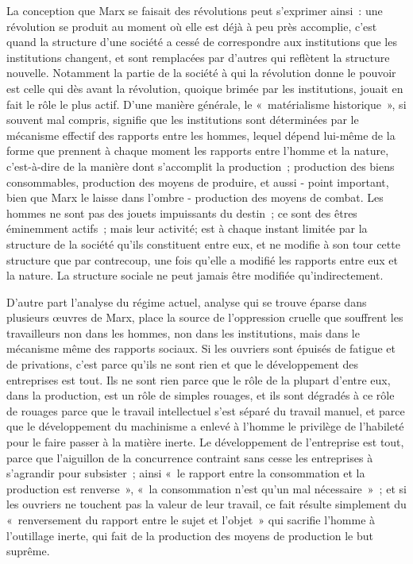 \documentclass[french,twoside]{book} %
\begin{document}
La conception que Marx se faisait des révolutions peut s'exprimer ainsi : une révolution se produit au moment où elle est déjà à peu près accomplie, c'est quand la structure d'une société a cessé de correspondre aux institutions que les institutions changent, et sont remplacées par d'autres qui reflètent la structure nouvelle. Notamment la partie de la société à qui la révolution donne le pouvoir est celle qui dès avant la révolution, quoique brimée par les institutions, jouait en fait le rôle le plus actif. D'une manière générale, le « matérialisme historique », si souvent mal compris, signifie que les institutions sont déterminées par le mécanisme effectif des rapports entre les hommes, lequel dépend lui-même de la forme que prennent à chaque moment les rapports entre l'homme et la nature, c'est-à-dire de la manière dont s'accomplit la production ; production des biens consommables, production des moyens de produire, et aussi - point important, bien que Marx le laisse dans l'ombre - production des moyens de combat. Les hommes ne sont pas des jouets impuissants du destin ; ce sont des êtres éminemment actifs ; mais leur activité; est à chaque instant limitée par la structure de la société qu'ils constituent entre eux, et ne modifie à son tour cette structure que par contrecoup, une fois qu'elle a modifié les rapports entre eux et la nature. La structure sociale ne peut jamais être modifiée qu'indirectement.\par
D'autre part l'analyse du régime actuel, analyse qui se trouve éparse dans plusieurs œuvres de Marx, place la source de l'oppression cruelle que souffrent les travailleurs non dans les hommes, non dans les institutions, mais dans le mécanisme même des rapports sociaux. Si les ouvriers sont épuisés de fatigue et de privations, c'est parce qu'ils ne sont rien et que le développement des entreprises est tout. Ils ne sont rien parce que le rôle de la plupart d'entre eux, dans la production, est un rôle de simples rouages, et ils sont dégradés à ce rôle de rouages parce que le travail intellectuel s'est séparé du travail manuel, et parce que le développement du machinisme a enlevé à l'homme le privilège de l'habileté pour le faire passer à la matière inerte. Le développement de l’entreprise est tout, parce que l'aiguillon de la concurrence contraint sans cesse les entreprises à s'agrandir pour subsister ; ainsi « le rapport entre la consommation et la production est renverse », « la consommation n'est qu'un mal nécessaire » ; et si les ouvriers ne touchent pas la valeur de leur travail, ce fait résulte simplement du « renversement du rapport entre le sujet et l'objet » qui sacrifie l'homme à l'outillage inerte, qui fait de la production des moyens de production le but suprême.\par
\end{document}
